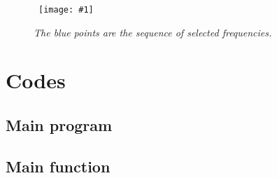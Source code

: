 \documentclass[a4paper, 12pt]{report}
\newcommand{\figscale}[4]{
\begin{figure}[hbtp]
\centerline{
    \hbox{ \texttt{[image: \#1]} }
}
\begin{center}
\parbox{12	 cm}
{
    \caption{\protect\small\it  {#2}}
    \label {#3}
}
\end{center}

\end{figure}}
\begin{document}
\figscale{example3onstation1.pdf}
{The blue points are the sequence of selected frequencies.}
{fig:example3onstation1}{0.8}

\chapter{Codes}
\section{Main program}
{\tiny}

\section{Main function}
{\tiny}
\end{document}
